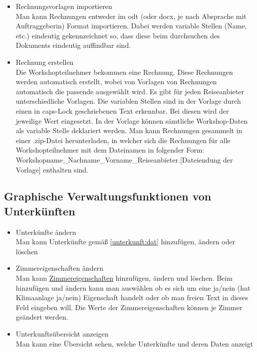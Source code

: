 \begin{itemize}[leftmargin=1.0in]
    \item [\lf] Rechnungsvorlagen importieren\\
        Man kann Rechnungen entweder im odt (oder docx, je nach Absprache mit Auftraggeberin) Format importieren. Dabei werden variable Stellen (Name, etc.) eindeutig gekennzeichnet so, dass diese beim durchsuchen des Dokuments eindeutig auffindbar sind. 
    \item [\lf] \label{rechnung:erstellen} Rechnung erstellen\\
        Die Workshopteilnehmer bekommen eine Rechnung. Diese Rechnungen werden automatisch erstellt, wobei von Vorlagen von Rechnungen automatisch die passende ausgewählt wird. Es gibt für jeden Reiseanbieter unterschiedliche Vorlagen. Die variablen Stellen sind in der Vorlage durch einen in caps-Lock geschriebenen Text erkennbar. Bei diesen wird der jeweilige Wert eingesetzt. In der Vorlage können sämtliche Workshop-Daten als variable Stelle deklariert werden. Man kann Rechnungen gesammelt in einer .zip-Datei herunterladen, in welcher sich die Rechnungen für alle Workshopteilnehmer mit dem Dateinamen in folgender Form: Workshopname\_Nachname\_Vorname\_Reiseanbieter.[Dateiendung der Vorlage] enthalten sind.
\end{itemize}
\lfn
\subsection{Graphische Verwaltungsfunktionen von Unterkünften}
\begin{itemize}[leftmargin=1.0in]
    \item [\lf] Unterkünfte ändern\\
        Man kann Unterkünfte gemäß \ref{unterkunft:dat} hinzufügen, ändern oder löschen
    \item [\lf] Zimmereigenschaften ändern\\
        Man kann \hyperref[unterkunft:zeigenschaft]{Zimmereigenschaften} hinzufügen, ändern und löschen. Beim hinzufügen und ändern kann man auswählen ob es sich um eine ja/nein (hat Klimaanlage ja/nein) Eigenschaft handelt oder ob man freien Text in dieses Feld eingeben will. Die Werte der Zimmereigenschaften können je Zimmer geändert werden.
    \item [\lf] Unterkunftsübersicht anzeigen\\
        Man kann eine Übersicht sehen, welche Unterkünfte und deren Daten anzeigt
\end{itemize}
